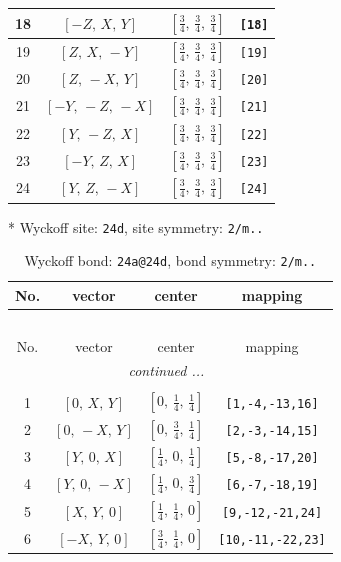 \documentclass[fleqn,8pt]{jsarticle}
\begin{document}
\begin{longtable}{cccc}
18 & $\left[ - Z,\, X,\, Y \right]$ & $\left[ \frac{3}{4},\, \frac{3}{4},\, \frac{3}{4} \right]$ & {\tt [18]} \\ \hline
19 & $\left[ Z,\, X,\, - Y \right]$ & $\left[ \frac{3}{4},\, \frac{3}{4},\, \frac{3}{4} \right]$ & {\tt [19]} \\ \hline
20 & $\left[ Z,\, - X,\, Y \right]$ & $\left[ \frac{3}{4},\, \frac{3}{4},\, \frac{3}{4} \right]$ & {\tt [20]} \\ \hline
21 & $\left[ - Y,\, - Z,\, - X \right]$ & $\left[ \frac{3}{4},\, \frac{3}{4},\, \frac{3}{4} \right]$ & {\tt [21]} \\ \hline
22 & $\left[ Y,\, - Z,\, X \right]$ & $\left[ \frac{3}{4},\, \frac{3}{4},\, \frac{3}{4} \right]$ & {\tt [22]} \\ \hline
23 & $\left[ - Y,\, Z,\, X \right]$ & $\left[ \frac{3}{4},\, \frac{3}{4},\, \frac{3}{4} \right]$ & {\tt [23]} \\ \hline
24 & $\left[ Y,\, Z,\, - X \right]$ & $\left[ \frac{3}{4},\, \frac{3}{4},\, \frac{3}{4} \right]$ & {\tt [24]} \\
\end{longtable}
* Wyckoff site: {\tt 24d}, site symmetry: {\tt 2/m..}
\renewcommand{\arraystretch}{1.2}
\begin{longtable}{cccc}
\caption{Wyckoff bond: {\tt 24a@24d}, bond symmetry: {\tt 2/m..}}
 \\
 \hline \hline
No. & vector & center & mapping \\ \hline \endfirsthead

\multicolumn{3}{l}{\tablename\ \thetable{}} \\
 \hline \hline
No. & vector & center & mapping \\ \hline \endhead

 \hline \hline
\multicolumn{3}{r}{\footnotesize\it continued ...} \\ \endfoot

 \hline \hline
\multicolumn{3}{r}{} \\ \endlastfoot

1 & $\left[ 0,\, X,\, Y \right]$ & $\left[ 0,\, \frac{1}{4},\, \frac{1}{4} \right]$ & {\tt [1,-4,-13,16]} \\ \hline
2 & $\left[ 0,\, - X,\, Y \right]$ & $\left[ 0,\, \frac{3}{4},\, \frac{1}{4} \right]$ & {\tt [2,-3,-14,15]} \\ \hline
3 & $\left[ Y,\, 0,\, X \right]$ & $\left[ \frac{1}{4},\, 0,\, \frac{1}{4} \right]$ & {\tt [5,-8,-17,20]} \\ \hline
4 & $\left[ Y,\, 0,\, - X \right]$ & $\left[ \frac{1}{4},\, 0,\, \frac{3}{4} \right]$ & {\tt [6,-7,-18,19]} \\ \hline
5 & $\left[ X,\, Y,\, 0 \right]$ & $\left[ \frac{1}{4},\, \frac{1}{4},\, 0 \right]$ & {\tt [9,-12,-21,24]} \\ \hline
6 & $\left[ - X,\, Y,\, 0 \right]$ & $\left[ \frac{3}{4},\, \frac{1}{4},\, 0 \right]$ & {\tt [10,-11,-22,23]} \\
\end{longtable}
\end{document}
